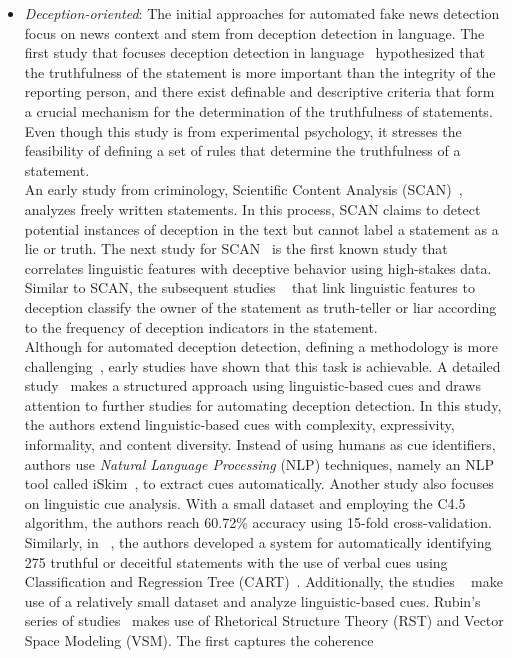 \begin{description}
\begin{itemize}
        \item \emph{Deception-oriented}: The initial approaches for automated fake news detection focus on news context and stem from deception detection in language. The first study that focuses deception detection in language~\parencite{DieEntwicklungDerGerichtspsychologischen_Undeutsch} hypothesized that the truthfulness of the statement is more important than the integrity of the reporting person, and there exist definable and descriptive criteria that form a crucial mechanism for the determination of the truthfulness of statements. Even though this study is from experimental psychology, it stresses the feasibility of defining a set of rules that determine the truthfulness of a statement.\\ An early study from criminology, Scientific Content Analysis (SCAN)~\parencite{SCAN_Sapir1987}, analyzes freely written statements.  In this process, SCAN claims to detect potential instances of deception in the text but cannot label a statement as a lie or truth. The next study for SCAN~\parencite{SCAN_Smith2001} is the first known study that correlates linguistic features with deceptive behavior using high-stakes data. Similar to SCAN, the subsequent studies  ~\parencite{CommunicationUnderStress_Adams, LyingWords_Newman} that link linguistic features to deception classify the owner of the statement as truth-teller or liar according to the frequency of deception indicators in the statement.\\Although for automated deception detection, defining a methodology is more challenging~\parencite{TheAccuracyConfidenceRelation_DePaulo}, early studies have shown that this task is achievable. A detailed study~\parencite{AutomatingLinguisticsBasedCues_Zhou} makes a structured approach using linguistic-based cues and draws attention to further studies for automating deception detection. In this study, the authors extend linguistic-based cues with complexity, expressivity, informality, and content diversity. Instead of using humans as cue identifiers, authors use \emph{Natural Language Processing} (NLP) techniques, namely an NLP tool called iSkim~\parencite{iSkim_Zhou}, to extract cues automatically. Another study also focuses on linguistic cue analysis. With a small dataset and employing the C4.5~\parencite{C45_Salzberg} algorithm, the authors reach 60.72\% accuracy using 15-fold cross-validation.\\Similarly, in ~\parencite{VerificatoinAndImplementationofLBDeceptionIndicators_Bachenko}, the authors developed a system for automatically identifying 275 truthful or deceitful statements with the use of verbal cues using Classification and Regression Tree (CART)~\parencite{ClassificationRegressioniTrees_Breiman}. Additionally, the studies ~\parencite{OnLyingAndBeingLiedTo_Hancock, OnDeceptionAndDeceptionDetection_Rubin} make use of a relatively small dataset and analyze linguistic-based cues. Rubin’s series of  studies~\parencite{OnDeceptionAndDeceptionDetection_Rubin, IdentificationOfTruth_Rubin, TruthAndDeception_Rubin, TowardsNewsVerification_Rubin} makes use of Rhetorical Structure Theory (RST) and Vector Space Modeling (VSM). The first captures the coherence 
\end{itemize}
\end{description}
